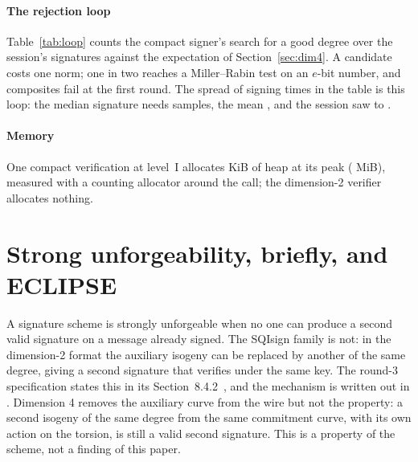 \documentclass[11pt]{article}
\begin{document}
\paragraph{The rejection loop}
Table~\ref{tab:loop} counts the compact signer's search for a good degree
over the session's signatures against the expectation of
Section~\ref{sec:dim4}.  A candidate costs one norm; one in two reaches a
Miller--Rabin test on an $e$-bit number, and composites fail at the first
round.  The spread of signing times in the table is this loop: the median
signature needs \LoopSamplesMedian{} samples, the mean \LoopSamplesMean{},
and the session saw \LoopSamplesMin{} to \LoopSamplesMax{}.

\begin{table}[H]
\centering
\caption{The compact signer's good-degree loop at level~I: measured over
the session's signatures against the density $1/(e \ln 2)$ for odd $q$
(and the figure for a candidate of random parity, which the sampler does
not produce).}
\label{tab:loop}
\small

\end{table}

\paragraph{Memory}
One compact verification at level~I allocates \PeakHeapKiB{} KiB of heap
at its peak (\PeakHeapMiB{} MiB), measured with a counting allocator
around the call; the dimension-2 verifier allocates nothing.

\section{Strong unforgeability, briefly, and ECLIPSE}
\label{sec:suf}

A signature scheme is strongly unforgeable when no one can produce a
second valid signature on a message already signed.  The SQIsign family is
not: in the dimension-2 format the auxiliary isogeny can be replaced by
another of the same degree, giving a second signature that verifies under
the same key.  The round-3 specification states this in its
Section~8.4.2~\cite{SQISignV3}, and the mechanism is written out in
\cite{Ray26}.  Dimension 4 removes the auxiliary curve from the wire but
not the property: a second isogeny of the same degree from the same
commitment curve, with its own action on the torsion, is still a valid
second signature.  This is a property of the scheme, not a finding of
this paper.
\end{document}
